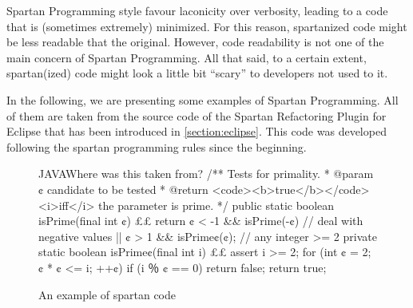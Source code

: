 Spartan Programming style favour laconicity over verbosity, leading to 
a code that is (sometimes extremely) minimized. For this reason, spartanized code might 
be less readable that the original. However, code readability is not one of 
the main concern of Spartan Programming. All that said, to a certain extent, 
spartan(ized) code might look a little bit ``scary'' to developers not used to it.

In the following, we are presenting some examples of Spartan Programming.
All of them are taken from the source code of the Spartan Refactoring 
Plugin for Eclipse that has been introduced in \cref{section:eclipse}. 
This code was developed following the spartan programming rules since 
the beginning.



% 
% 
\begin{figure}[h]
\label{figure:shock-2}
\caption{An example of spartan code}
\begin{Code}{JAVA}{Where was this taken from?}
/** Tests for primality.
  * @param ¢ candidate to be tested
  * @return <code><b>true</b></code> <i>iff</i> the parameter is prime. */
public static boolean isPrime(final int ¢) {££
  return ¢ < -1 && isPrime(-¢) // deal with negative values
      || ¢ > 1 && isPrime¢(¢); // any integer >= 2
}
private static boolean isPrime¢(final int i) {££
  assert i >= 2;
  for (int ¢ = 2; ¢ * ¢ <= i; ++¢)
    if (i ％ ¢ == 0)
      return false;
  return true;
}
\end{Code}
\end{figure}


